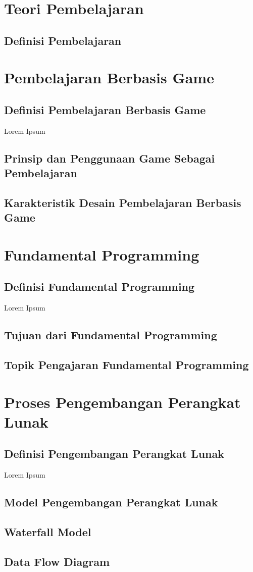 \section{Teori Pembelajaran}
	\subsection{Definisi Pembelajaran}
	
\section{Pembelajaran Berbasis Game}
	\subsection{Definisi Pembelajaran Berbasis Game}
	Lorem Ipsum
	\subsection{Prinsip dan Penggunaan Game Sebagai Pembelajaran}
	\subsection{Karakteristik Desain Pembelajaran Berbasis Game}
	
\section{Fundamental Programming}
	\subsection{Definisi Fundamental Programming}
	Lorem Ipsum
	\subsection{Tujuan dari Fundamental Programming}
	\subsection{Topik Pengajaran Fundamental Programming}
	
\section{Proses Pengembangan Perangkat Lunak}
	\subsection{Definisi Pengembangan Perangkat Lunak}
	Lorem Ipsum
	\subsection{Model Pengembangan Perangkat Lunak}
	\subsection{Waterfall Model}
	\subsection{Data Flow Diagram}
